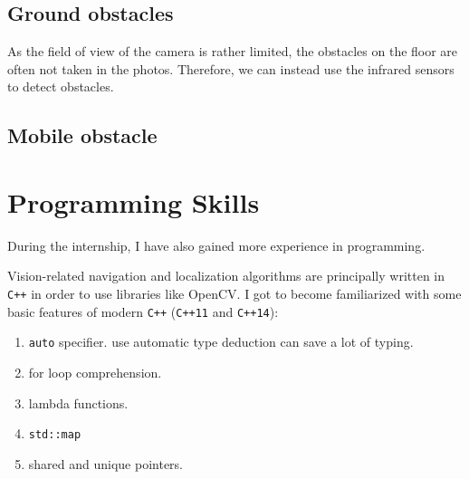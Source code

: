 \documentclass[a4paper]{scrartcl}
\newcommand{\ttt}[1]{\texttt{#1}}
\begin{document}


\subsection{Ground obstacles}
As the field of view of the camera is rather limited, the obstacles on the floor are often not taken in the photos. Therefore, we can instead use the infrared sensors to detect obstacles.

\subsection{Mobile obstacle}




\section{Programming Skills}
During the internship, I have also gained more experience in programming.

Vision-related navigation and localization algorithms are principally written in \ttt{C++} in order to use libraries like OpenCV. I got to become familiarized with some basic features of modern \ttt{C++} (\ttt{C++11} and \ttt{C++14}):

\begin{enumerate}
\item \ttt{auto} specifier. use automatic type deduction can save a lot of typing.
\item for loop comprehension.
\item lambda functions.
\item \ttt{std::map}
\item shared and unique pointers.
\end{enumerate}


\newpage
\printbibliography
\end{document}
